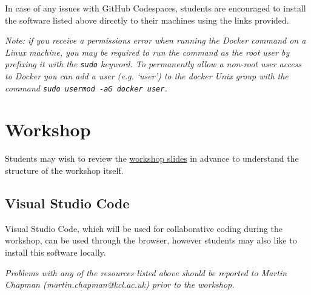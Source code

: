 \documentclass{article}
\begin{document}
In case of any issues with GitHub Codespaces, students are encouraged to install the software listed above directly to their machines using the links provided. 

\emph{Note: if you receive a permissions error when running the Docker command on a Linux machine, you may be required to run the command as the root user by prefixing it with the \texttt{sudo} keyword. 
To permanently allow a non-root user access to Docker you can add a user (e.g. `user') to the docker Unix group with the command \texttt{sudo usermod -aG docker user}.}

\section{Workshop}

Students may wish to review the \href{https://github.com/martinteaching/sustainability/blob/master/workshops/kcl/2025/workshop-slides.md}{workshop slides} in advance to understand the structure of the workshop itself.

\subsection{Visual Studio Code}

Visual Studio Code, which will be used for collaborative coding during the workshop, can be used through the browser, however students may also like to install this software locally.

\emph{Problems with any of the resources listed above should be reported to Martin Chapman (martin.chapman@kcl.ac.uk) prior to the workshop.}
\end{document}
